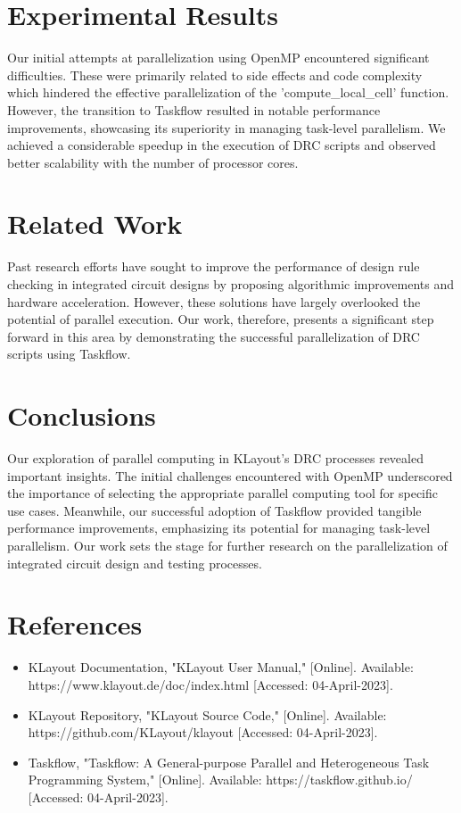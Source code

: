 \documentclass[sigconf]{acmart}
\begin{document}
  \section{Experimental Results}
  Our initial attempts at parallelization using OpenMP encountered significant difficulties. These were primarily related to side effects and code complexity which hindered the effective parallelization of the 'compute\_local\_cell' function. However, the transition to Taskflow resulted in notable performance improvements, showcasing its superiority in managing task-level parallelism. We achieved a considerable speedup in the execution of DRC scripts and observed better scalability with the number of processor cores.
  
  \section{Related Work}
  Past research efforts have sought to improve the performance of design rule checking in integrated circuit designs by proposing algorithmic improvements and hardware acceleration. However, these solutions have largely overlooked the potential of parallel execution. Our work, therefore, presents a significant step forward in this area by demonstrating the successful parallelization of DRC scripts using Taskflow.
  
  \section{Conclusions}
  Our exploration of parallel computing in KLayout's DRC processes revealed important insights. The initial challenges encountered with OpenMP underscored the importance of selecting the appropriate parallel computing tool for specific use cases. Meanwhile, our successful adoption of Taskflow provided tangible performance improvements, emphasizing its potential for managing task-level parallelism. Our work sets the stage for further research on the parallelization of integrated circuit design and testing processes.
  
  \section{References}
  \begin{itemize}
    \item KLayout Documentation, "KLayout User Manual," [Online]. Available: https://www.klayout.de/doc/index.html [Accessed: 04-April-2023].
    \item KLayout Repository, "KLayout Source Code," [Online]. Available: https://github.com/KLayout/klayout [Accessed: 04-April-2023].
    \item Taskflow, "Taskflow: A General-purpose Parallel and Heterogeneous Task Programming System," [Online]. Available: https://taskflow.github.io/ [Accessed: 04-April-2023].
  \end{itemize}
  
  
\end{document}
